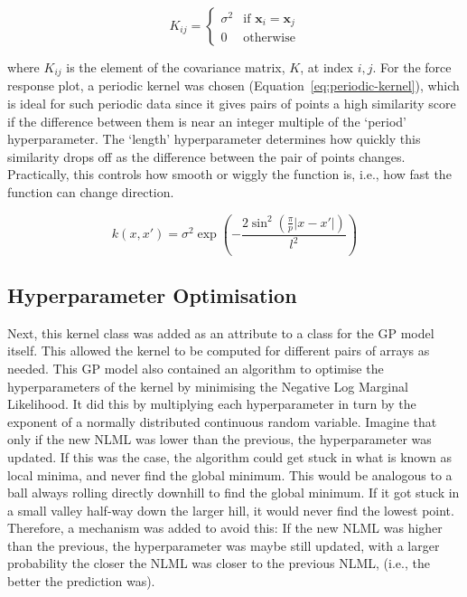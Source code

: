 \documentclass[12pt]{article}
\begin{document}
    \begin{equation}
        K_{ij} =
        \begin{cases}
            \sigma^2 & \text{if } \mathbf{x}_i = \mathbf{x}_j \\
            0 & \text{otherwise}
        \end{cases}\label{eq:white-noise-kernel}
    \end{equation}

    where $K_{ij}$ is the element of the covariance matrix, $K$, at index $i, j$.
    For the force response plot, a periodic kernel was chosen (Equation~\ref{eq:periodic-kernel}), which is ideal for such periodic data since it gives pairs of points a high similarity score if the difference between them is near an integer multiple of the `period' hyperparameter.
    The `length' hyperparameter determines how quickly this similarity drops off as the difference between the pair of points changes.
    Practically, this controls how smooth or wiggly the function is, i.e., how fast the function can change direction.

    \begin{equation}
        k(x, x') = \sigma^2 \exp\left(- \frac{2 \sin^2\left(\frac{\pi}{p} |x - x'|\right)}{l^2}\right)\label{eq:periodic-kernel}
    \end{equation}

    \subsection{Hyperparameter Optimisation}
    Next, this kernel class was added as an attribute to a class for the GP model itself.
    This allowed the kernel to be computed for different pairs of arrays as needed.
    This GP model also contained an algorithm to optimise the hyperparameters of the kernel by minimising the Negative Log Marginal Likelihood.
    It did this by multiplying each hyperparameter in turn by the exponent of a normally distributed continuous random variable.
    Imagine that only if the new NLML was lower than the previous, the hyperparameter was updated.
    If this was the case, the algorithm could get stuck in what is known as local minima, and never find the global minimum.
    This would be analogous to a ball always rolling directly downhill to find the global minimum.
    If it got stuck in a small valley half-way down the larger hill, it would never find the lowest point.
    Therefore, a mechanism was added to avoid this:
    If the new NLML was higher than the previous, the hyperparameter was maybe still updated, with a larger probability the closer the NLML was closer to the previous NLML, (i.e., the better the prediction was).
\end{document}
